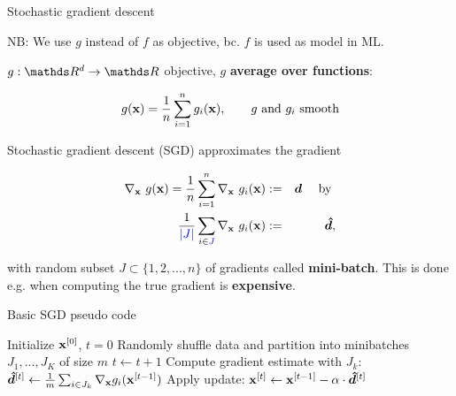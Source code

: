 \documentclass[11pt,compress,t,notes=noshow, xcolor=table]{beamer}
\begin{document}
\begin{vbframe}{Stochastic gradient descent}

NB: We use $g$ instead of $f$ as objective, bc. $f$ is used as model in ML. 

\lz 

$g: \R^d \to \R$ objective, $g$ \textbf{average over functions}: 

$$
	g(\mathbf{x}) = \frac{1}{n}\sum\limits_{i=1}^n g_i(\mathbf{x}), \qquad g \text{ and } g_i \text{ smooth}
$$

Stochastic gradient descent (SGD) approximates the gradient 

\vspace*{-0.2cm}

\begin{eqnarray*}
	\nabla_{\mathbf{x}}~ g(\mathbf{x}) = \frac{1}{n}\sum\limits_{i=1}^n \nabla_{\mathbf{x}}~g_i(\mathbf{x}) &:=& \bm{d} \quad \text{ by }\\
	\frac{1}{\textcolor{blue}{|J|}}\sum_{i \in \textcolor{blue}{J}} \nabla_{\mathbf{x}}~g_i(\mathbf{x}) &:=& \bm{\hat d}, 
\end{eqnarray*}

with random subset $J \subset \{1, 2, ..., n\}$ of gradients called \textbf{mini-batch}. This is done e.g. when computing the true gradient is \textbf{expensive}. 

\framebreak 

	\begin{algorithm}[H]
		\footnotesize
		\caption{Basic SGD pseudo code}
		\begin{algorithmic}[1]
			\State Initialize $\mathbf{x}^{[0]}$, $t = 0$ 
			\State Randomly shuffle data and partition into minibatches $J_1, ..., J_K$ of size $m$
			\State $t \leftarrow t + 1$ 
			\State Compute gradient estimate with $J_k$: $\bm{\hat{d}}^{[t]} \leftarrow \frac{1}{m} \sum_{i \in J_k} \nabla_{\mathbf{x}} g_i(\mathbf{x}^{[t - 1]}) $
			\State Apply update: $\mathbf{x}^{[t]} \leftarrow \mathbf{x}^{[t-1]} - \alpha \cdot \bm{\hat{d}}^{[t]}$
			
			\EndFor		
			
			\EndWhile
		\end{algorithmic}
	\end{algorithm}

\vspace*{0.2cm}


\end{vbframe}
\end{document}
